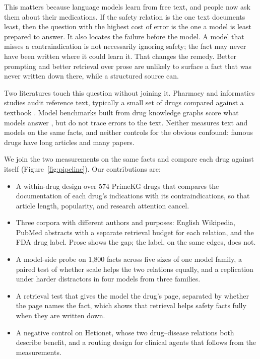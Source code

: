 \documentclass[letterpaper]{article} %
\begin{document}
This matters because language models learn from free text, and people now ask
them about their medications. If the safety relation is the one text
documents least, then the question with the highest cost of error is the one a
model is least prepared to answer. It also locates the failure before the
model. A model that misses a contraindication is not necessarily ignoring
safety; the fact may never have been written where it could learn it. That
changes the remedy. Better prompting and better retrieval over prose are unlikely to surface a
fact that was never written down there, while a structured source can.

Two literatures touch this question without joining it. Pharmacy and
informatics studies audit reference text, typically a small set of drugs
compared against a textbook \citep{clauson2008scope,kraenbring2014accuracy}.
Model benchmarks built from drug knowledge graphs score what models answer
\citep{liu2026mhgraphbench}, but do not trace errors to the text. Neither
measures text and models on the same facts, and neither controls for the
obvious confound: famous drugs have long articles and many papers.

We join the two measurements on the same facts and compare each drug against
itself (Figure~\ref{fig:pipeline}). Our contributions are:
\begin{itemize}
\item A within-drug design over 574 PrimeKG drugs that compares the
documentation of each drug's indications with its contraindications, so that
article length, popularity, and research attention cancel.
\item Three corpora with different authors and purposes: English Wikipedia,
PubMed abstracts with a separate retrieval budget for each relation, and the
FDA drug label. Prose shows the gap; the label, on the same edges, does not.
\item A model-side probe on 1,800 facts across five sizes of one model family,
a paired test of whether scale helps the two relations equally, and a
replication under harder distractors in four models from three families.
\item A retrieval test that gives the model the drug's page, separated by
whether the page names the fact, which shows that retrieval helps safety facts
fully when they are written down.
\item A negative control on Hetionet, whose two drug--disease relations both
describe benefit, and a routing design for clinical agents that follows from
the measurements.
\end{itemize}
\end{document}
